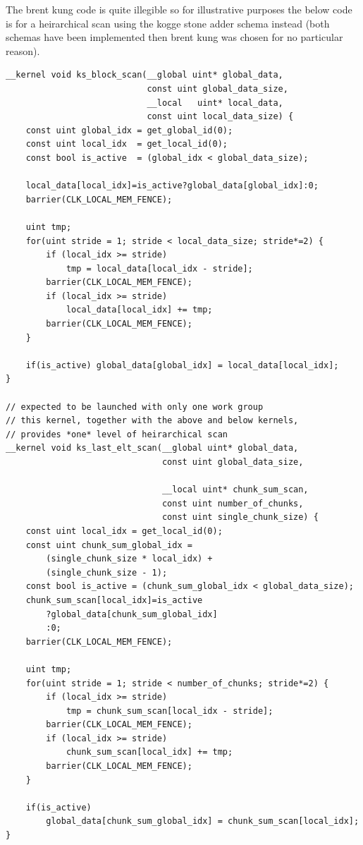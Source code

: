 \documentclass[11pt]{article}
\begin{document}
The brent kung code is quite illegible so for illustrative purposes the below code is for a heirarchical scan using the kogge stone adder schema instead (both schemas have been implemented then brent kung was chosen for no particular reason).
\begin{verbatim}
__kernel void ks_block_scan(__global uint* global_data,
                            const uint global_data_size,
                            __local   uint* local_data,
                            const uint local_data_size) {
    const uint global_idx = get_global_id(0);
    const uint local_idx  = get_local_id(0);
    const bool is_active  = (global_idx < global_data_size);

    local_data[local_idx]=is_active?global_data[global_idx]:0;
    barrier(CLK_LOCAL_MEM_FENCE);

    uint tmp;
    for(uint stride = 1; stride < local_data_size; stride*=2) {
        if (local_idx >= stride)
            tmp = local_data[local_idx - stride];
        barrier(CLK_LOCAL_MEM_FENCE);
        if (local_idx >= stride)
            local_data[local_idx] += tmp;
        barrier(CLK_LOCAL_MEM_FENCE);
    }

    if(is_active) global_data[global_idx] = local_data[local_idx];
}

// expected to be launched with only one work group
// this kernel, together with the above and below kernels,
// provides *one* level of heirarchical scan
__kernel void ks_last_elt_scan(__global uint* global_data,
                               const uint global_data_size,

                               __local uint* chunk_sum_scan,
                               const uint number_of_chunks,
                               const uint single_chunk_size) {
    const uint local_idx = get_local_id(0);
    const uint chunk_sum_global_idx =
        (single_chunk_size * local_idx) +
        (single_chunk_size - 1);
    const bool is_active = (chunk_sum_global_idx < global_data_size);
    chunk_sum_scan[local_idx]=is_active
        ?global_data[chunk_sum_global_idx]
        :0;
    barrier(CLK_LOCAL_MEM_FENCE);

    uint tmp;
    for(uint stride = 1; stride < number_of_chunks; stride*=2) {
        if (local_idx >= stride)
            tmp = chunk_sum_scan[local_idx - stride];
        barrier(CLK_LOCAL_MEM_FENCE);
        if (local_idx >= stride)
            chunk_sum_scan[local_idx] += tmp;
        barrier(CLK_LOCAL_MEM_FENCE);
    }

    if(is_active)
        global_data[chunk_sum_global_idx] = chunk_sum_scan[local_idx];
}


\end{verbatim}
\end{document}
